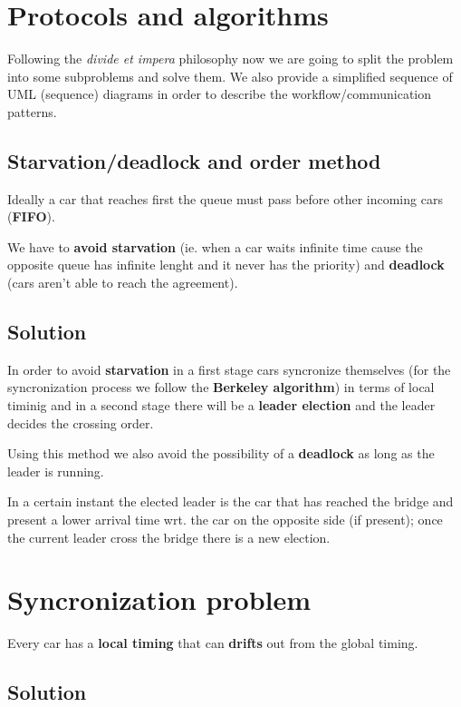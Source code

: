 \section{Protocols and algorithms}

Following the \textit{divide et impera} philosophy now we are going to split the problem 
into some subproblems and solve them. 
We also provide a simplified sequence of UML (sequence) diagrams in order to 
describe the workflow/communication patterns.


\subsection{Starvation/deadlock and order method}

Ideally a car that reaches first the queue must pass before other 
incoming cars (\textbf{FIFO}).

We have to \textbf{avoid starvation} (ie. when a car waits infinite time cause the opposite queue 
has infinite lenght and it never has the priority) and \textbf{deadlock} (cars aren't able to 
reach the agreement). 


\subsection{Solution}

In order to avoid \textbf{starvation} in a first stage cars syncronize themselves 
(for the syncronization process we follow the \textbf{Berkeley algorithm})
in terms of local timinig and in a second stage there will be a \textbf{leader election} 
and the leader decides the crossing order. 

Using this method we also avoid 
the possibility of a \textbf{deadlock} as long as the leader is running.

In a certain instant the elected leader is the car that has reached the bridge and 
present a lower arrival time wrt. the car on the opposite side (if present); 
once the current leader cross the bridge there is a new election.\\


\section{Syncronization problem}

Every car has a \textbf{local timing} that can \textbf{drifts} out from the 
global timing. 


\subsection{Solution}

